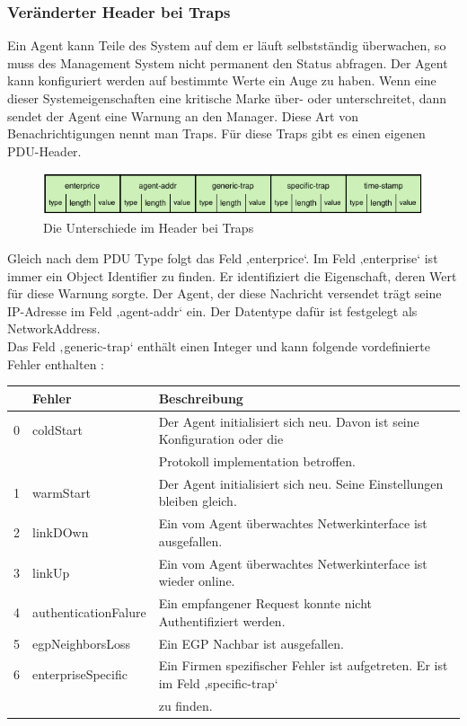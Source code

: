 \documentclass[11pt,a4paper]{article}
\begin{document}
\subsubsection{Veränderter Header bei Traps}
Ein Agent kann Teile des System auf dem er läuft selbstständig überwachen, so muss des Management System nicht permanent den Status abfragen. Der Agent kann konfiguriert werden auf bestimmte Werte ein Auge zu haben. Wenn eine dieser Systemeigenschaften eine kritische Marke über- oder unterschreitet, dann sendet der Agent eine Warnung an den Manager. Diese Art von Benachrichtigungen nennt man Traps. Für diese Traps gibt es einen eigenen PDU-Header.\\
\begin{figure}[h]
	\centering
	\includegraphics[scale=.8]{Bilder/SNMPv1-Header-Traps.png}
	\caption{Die Unterschiede im Header bei Traps}
\end{figure}
Gleich nach dem PDU Type folgt das Feld ‚enterprice‘. Im Feld ‚enterprise‘ ist immer ein Object Identifier zu finden. Er identifiziert die Eigenschaft, deren Wert für diese Warnung sorgte. Der Agent, der diese Nachricht versendet trägt seine IP-Adresse im Feld ‚agent-addr‘ ein. Der Datentype dafür ist festgelegt als NetworkAddress.\\
Das Feld ‚generic-trap‘ enthält einen Integer und kann folgende vordefinierte Fehler enthalten :\\
\begin{tabular}{| c | l | l |}
	\hline
	\rowcolor{lgray}
		& Fehler	&	Beschreibung\\
	\hline
	0	& coldStart						&	Der Agent initialisiert sich neu. Davon ist seine Konfiguration oder die\\
		&										&	Protokoll implementation betroffen.\\
	\hline
	1	& warmStart						&	Der Agent initialisiert sich neu. Seine Einstellungen bleiben gleich.\\
	\hline
	2	&	linkDOwn						&	Ein vom Agent überwachtes Netwerkinterface ist ausgefallen.\\
	\hline
	3	&	linkUp							&	Ein vom Agent überwachtes Netwerkinterface ist wieder online.\\
	\hline
	4	&	authenticationFalure	&	Ein empfangener Request konnte nicht Authentifiziert werden.\\
	\hline
	5	&	egpNeighborsLoss		&	Ein EGP Nachbar ist ausgefallen.\\
	\hline
	6	&	enterpriseSpecific			&	Ein Firmen spezifischer Fehler ist aufgetreten. Er ist im Feld ‚specific-trap‘\\
		&										&	zu finden.\\
	\hline
\end{tabular}
\emptyline
\end{document}

